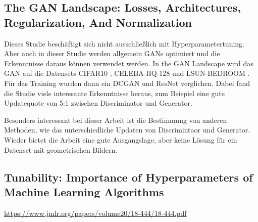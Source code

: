 \subsection{The GAN Landscape: Losses, Architectures, Regularization, And Normalization \cite{gan-landscape-losses-architectures-regularization-normalization}}
Dieses Studie beschäftigt sich nicht ausschließlich mit Hyperparametertuning.
Aber auch in dieser Studie werden allgemein GANs optimiert und die Erkenntnisse daraus können verwendet werden.
In the GAN Landscape wird das GAN auf die Datensets CIFAR10 \cite{dataset:cifar10}, CELEBA-HQ-128 und LSUN-BEDROOM \cite{dataset:lsun}.
Für das Training wurden dann ein DCGAN und ResNet verglichen.
Dabei fand die Studie viele interssante Erkenntnisse heraus, zum Beispiel eine gute Updatequote von 5:1 zwischen Discriminator und Generator.
\newline

Besonders interessant bei dieser Arbeit ist die Bestimmung von anderen Methoden, wie das unterschiedliche Updaten von Discrimintaor und Generator.
Wieder bietet die Arbeit eine gute Ausgangslage, aber keine Lösung für ein Datenset mit geometrischen Bildern.

\subsection{Tunability: Importance of Hyperparameters of Machine Learning Algorithms}
\url{https://www.jmlr.org/papers/volume20/18-444/18-444.pdf}

